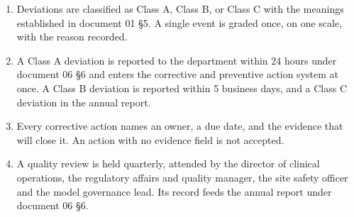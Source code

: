 \begin{enumerate}
\item Deviations are classified as Class A, Class B, or Class C with the
  meanings established in document 01 §5. A single event is graded once, on one
  scale, with the reason recorded.

\item A Class A deviation is reported to the department within 24 hours under
  document 06 §6 and enters the corrective and preventive action system at once.
  A Class B deviation is reported within 5 business days, and a Class C deviation
  in the annual report.

\item Every corrective action names an owner, a due date, and the evidence that
  will close it. An action with no evidence field is not accepted.

\item A quality review is held quarterly, attended by the director of clinical
  operations, the regulatory affairs and quality manager, the site safety officer
  and the model governance lead. Its record feeds the annual report under
  document 06 §6.
\end{enumerate}
